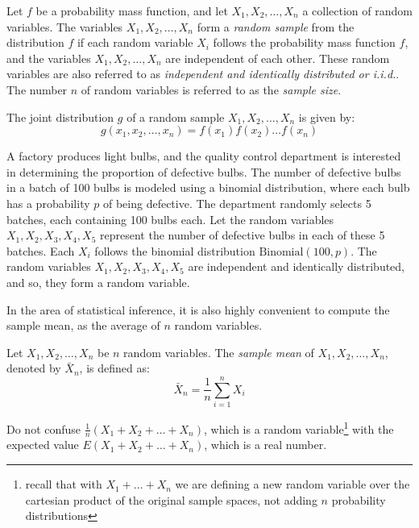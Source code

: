 \begin{definition}
Let $f$ be a probability mass function, and let $X_1, X_2, \ldots, X_n$ a collection of random variables.  The variables $X_1, X_2, \ldots, X_n$ form a \emph{random sample} from the distribution $f$ if each random variable $X_i$ follows the probability mass function $f$, and the variables $X_1, X_2, \ldots, X_n$ are independent of each other. These random variables are also referred to as \emph{independent and identically distributed or i.i.d.}. The number $n$ of random variables is referred to as the \emph{sample size}.
\end{definition}

The joint distribution $g$ of a random sample $X_1, X_2, \ldots, X_n$ is given by:
\[
g \left( x_1, x_2, \ldots, x_n \right) = f \left( x_1 \right) f \left( x_2 \right) \ldots f \left( x_n \right)
\]

\begin{example}
A factory produces light bulbs, and the quality control department is interested in determining the proportion of defective bulbs. The number of defective bulbs in a batch of 100 bulbs is modeled using a binomial distribution, where each bulb has a probability $p$ of being defective. The department randomly selects 5 batches, each containing 100 bulbs each. Let the random variables $X_1, X_2, X_3, X_4, X_5$ represent the number of defective bulbs in each of these 5 batches. Each $X_i$ follows the binomial distribution \( \text{Binomial}(100, p) \). The random variables $X_1, X_2, X_3, X_4, X_5$ are independent and identically distributed, and so, they form a random variable.
\end{example}

In the area of statistical inference, it is also highly convenient to compute the sample mean, as the average of $n$ random variables.
\begin{definition}
Let $X_1, X_2, \ldots, X_n$ be $n$ random variables. The \emph{sample mean} of $X_1, X_2, \ldots, X_n$, denoted by $\bar{X}_n$, is defined as:
\[
\bar{X}_n = \frac{1}{n} \sum_{i=1}^n X_i
\]
\end{definition}

Do not confuse $\frac{1}{n} \left( X_1 + X_2 + \ldots + X_n \right)$, which is a random variable\footnote{recall that with $X_1 + \ldots + X_n$ we are defining a new random variable over the cartesian product of the original sample spaces, not adding $n$ probability distributions} with the expected value $E \left( X_1 + X_2 + \ldots + X_n \right)$, which is a real number.


